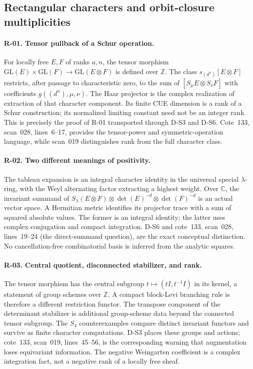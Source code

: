 \subsection{Rectangular characters and orbit-closure multiplicities}

\paragraph{R-01. Tensor pullback of a Schur operation.}
For locally free $E,F$ of ranks $a,n$, the tensor morphism $\mathrm{GL}(E)\times\mathrm{GL}(F)\to\mathrm{GL}(E\otimes F)$ is defined over $\mathbb Z$. The class $s_{(d^n)}[E\otimes F]$ restricts, after passage to characteristic zero, to the sum of $[S_\mu E\otimes S_\nu F]$ with coefficients $g((d^n),\mu,\nu)$. The Haar projector is the complex realization of extraction of that character component. Its finite CUE dimension is a rank of a Schur construction; its normalized limiting constant need not be an integer rank. This is precisely the proof of R-01 transported through D-S3 and D-S6. Cote~133, scan~028, lines~6--17, provides the tensor-power and symmetric-operation language, while scan~019 distinguishes rank from the full character class.

\paragraph{R-02. Two different meanings of positivity.}
The tableau expansion is an integral character identity in the universal special $\lambda$-ring, with the Weyl alternating factor extracting a highest weight. Over $\mathbb C$, the invariant summand of $S_\lambda(E\otimes F)\otimes\det(E)^{-d}\otimes\det(F)^{-d}$ is an actual vector space. A Hermitian metric identifies its projector trace with a sum of squared absolute values. The former is an integral identity; the latter uses complex conjugation and compact integration. D-S6 and cote~133, scan~028, lines~19--24 (the direct-summand question), are the exact conceptual distinction. No cancellation-free combinatorial basis is inferred from the analytic squares.

\paragraph{R-03. Central quotient, disconnected stabilizer, and rank.}
The tensor morphism has the central subgroup $t\mapsto(tI,t^{-1}I)$ in its kernel, a statement of group schemes over $\mathbb Z$. A compact block-Levi branching rule is therefore a different restriction functor. The transpose component of the determinant stabilizer is additional group-scheme data beyond the connected tensor subgroup. The $S_4$ counterexamples compare distinct invariant functors and survive as finite character computations. D-S3 places these groups and actions; cote~133, scan~019, lines~45--56, is the corresponding warning that augmentation loses equivariant information. The negative Weingarten coefficient is a complex integration fact, not a negative rank of a locally free sheaf.

